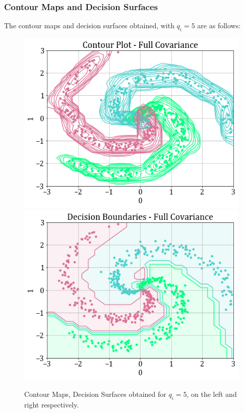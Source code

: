 \documentclass[11pt,a4paper]{article}
\begin{document}
\subsubsection{Contour Maps and Decision Surfaces}
The contour maps and decision surfaces obtained, with $q_i=5$ are as follows:
\begin{figure}[H]
    \hspace{-1em}
    \includegraphics[scale=0.45]{images/1B/1b_full_contours.png}
    \includegraphics[scale=0.45]{images/1B/1b_full_decision_surfaces.png}
    \caption{Contour Maps, Decision Surfaces obtained for $q_i=5$, on the left and right respectively.}
\end{figure}
\end{document}
